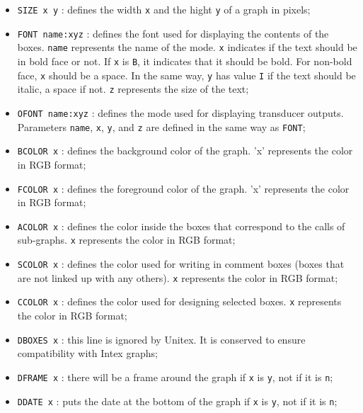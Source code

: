 \begin{itemize}
  \item \verb+SIZE x y+ : defines the width \verb+x+ and the hight \verb+y+ of a graph in pixels;
  
  \item \verb+FONT name:xyz+ : defines the font used for displaying the contents
  of the boxes. \verb+name+ represents the name of the mode. \verb+x+ indicates
  if the text should be in bold face or not. If \verb+x+ is \verb+B+, it
  indicates that it should be bold. For non-bold face, \verb+x+ should be a
  space. In the same way, \verb+y+ has value \verb+I+ if the text should be
  italic, a space if not. \verb+z+ represents the size of the text;

  \item \verb+OFONT name:xyz+ : defines the mode used for displaying transducer
  outputs. Parameters \verb+name+, \verb+x+, \verb+y+, and \verb+z+ are defined
  in the same way as \verb+FONT+;
  
  \item \verb+BCOLOR x+ : defines the background color of the graph. 'x'
  represents the color in RGB format;

  \item \verb+FCOLOR x+ : defines the foreground color of the graph. 'x'
  represents the color in RGB format;

  \item \verb+ACOLOR x+ : defines the color inside the boxes that correspond to
  the calls of sub-graphs. \verb+x+ represents the color in RGB format;

  \item \verb+SCOLOR x+ :  defines the color used for writing in comment boxes
  (boxes that are not linked up with any others). \verb+x+ represents the color
  in RGB format;

  \item \verb+CCOLOR x+ : defines the color used for designing selected boxes.
  \verb+x+ represents the color in RGB format;

  \item \verb+DBOXES x+ : this line is ignored by Unitex. It is conserved to
  ensure compatibility with Intex graphs;

  \item \verb+DFRAME x+ : there will be a frame around the graph if \verb+x+ is
  \verb+y+, not if it is \verb+n+;

  \item \verb+DDATE x+ : puts the date at the bottom of the graph if \verb+x+ is
  \verb+y+, not if it is \verb+n+;


\end{itemize}
